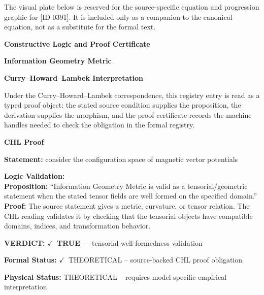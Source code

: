 \begingroup\footnotesize\sloppy
The visual plate below is reserved for the source-specific equation and progression graphic for [ID 0391]. It is included only as a companion to the canonical equation, not as a substitute for the formal text.
\par\endgroup
\ifTZPDarkEdition
{}
\fi

\clearpage
\begingroup\tzpsupportsetup
\noindent\textbf{\fontsize{10.8pt}{12.8pt}\selectfont [ID 0391] Constructive Logic and Proof Certificate}\par
\noindent\textbf{\fontsize{10pt}{12pt}\selectfont Information Geometry Metric}\par
\vspace{0.45em}
\begingroup
\footnotesize
\setlength{\parskip}{0.22em}
\setlength{\parindent}{0pt}
\noindent\textbf{Curry--Howard--Lambek Interpretation}\par
Under the Curry--Howard--Lambek correspondence, this registry entry is read as a typed proof
object: the stated source condition supplies the proposition, the derivation supplies the
morphism, and the proof certificate records the machine handles needed to check the obligation
in the formal registry.

\vspace{0.45em}
\noindent\textbf{CHL Proof}\par
\textbf{Statement:} consider the configuration space of magnetic vector potentials

\textbf{Logic Validation:}\\
\textbf{Proposition:} ``Information Geometry Metric is valid as a tensorial/geometric statement when the stated
tensor fields are well formed on the specified domain.''\\
\textbf{Proof:} The source statement gives a metric, curvature, or tensor relation. The CHL reading
validates it by checking that the tensorial objects have compatible domains, indices,
and transformation behavior.

\textbf{VERDICT:} \ensuremath{\checkmark}\ \textbf{TRUE} --- tensorial well-formedness validation

\textbf{Formal Status:} \ensuremath{\checkmark}\ THEORETICAL -- source-backed CHL proof obligation

\textbf{Physical Status:} THEORETICAL -- requires model-specific empirical interpretation
\par\vspace{0.45em}
\par
\ifTZPDarkEdition
{}
\fi
\endgroup
\endgroup
